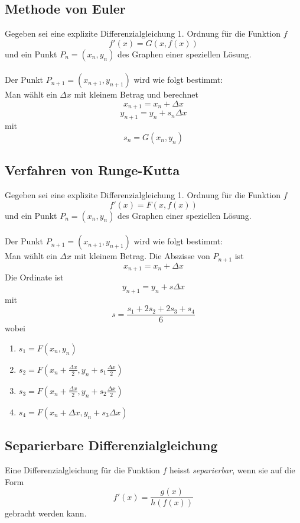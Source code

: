 \documentclass[10pt,a4paper]{scrartcl}
\begin{document}
\subsection{Methode von Euler}

Gegeben sei eine explizite Differenzialgleichung 1. Ordnung für die Funktion $f$
$$f'(x) = G(x,f(x))$$
und ein Punkt $P_n = (x_n,y_n)$ des Graphen einer speziellen Lösung.\\\\
Der Punkt $P_{n+1} = (x_{n+1}, y_{n+1})$ wird wie folgt bestimmt:\\
Man wählt ein $\Delta{x}$ mit kleinem Betrag und berechnet
$$x_{n+1} = x_n + \Delta x$$
$$y_{n+1} = y_n + s_n\Delta x$$
mit
$$s_n = G(x_n,y_n)$$


\subsection{Verfahren von Runge-Kutta}

Gegeben sei eine explizite Differenzialgleichung 1. Ordnung für die Funktion $f$
$$f'(x) = F(x, f(x))$$
und ein Punkt $P_n = (x_n, y_n)$ des Graphen einer speziellen Lösung.\\\\
Der Punkt $P_{n+1} = (x_{n+1},y_{n+1})$ wird wie folgt bestimmt:\\
Man wählt ein $\Delta{x}$ mit kleinem Betrag. Die Abszisse von $P_{n+1}$ ist
$$x_{n+1} = x_n + \Delta x$$
Die Ordinate ist
$$y_{n+1} = y_n + s\Delta x$$
mit
$$s = \frac{s_1 + 2s_2 + 2s_3 + s_4}{6}$$
wobei
\begin{enumerate}
\item $\displaystyle s_1 = F(x_n, y_n)$
\item $\displaystyle s_2 = F\left(x_n + \frac{\Delta{x}}{2}, y_n + s_1 \frac{\Delta x}{2}\right)$
\item $\displaystyle s_3 = F\left(x_n + \frac{\Delta{x}}{2}, y_n + s_2 \frac{\Delta x}{2}\right)$
\item $\displaystyle s_4 = F(x_n+\Delta x, y_n+s_3\Delta x)$
\end{enumerate}


\subsection{Separierbare Differenzialgleichung}

Eine Differenzialgleichung für die Funktion $f$ heisst
\textit{separierbar}, wenn sie auf die Form
$$f'(x) = \frac{g(x)}{h(f(x))}$$
gebracht werden kann.
\end{document}
